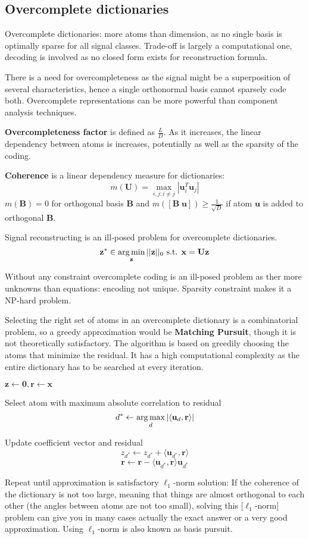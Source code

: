 \documentclass[12pt]{article}
\begin{document}
\subsection{Overcomplete dictionaries}
\par Overcomplete dictionaries: more atoms than dimension, as no single basis is optimally sparse for all signal classes. Trade-off is largely a computational one, decoding is involved as no closed form exists for reconstruction formula.
\par There is a need for overcompleteness as the signal might be a superposition of several characteristics, hence a single orthonormal basis cannot sparsely code both. Overcomplete representations can be more powerful than component analysis techniques.
\par \textbf{Overcompleteness factor} is defined as $\frac{L}{D}$. As it increases, the linear dependency between atoms is increases, potentially as well as the sparsity of the coding.
\par \textbf{Coherence} is a linear dependency measure for dictionaries:
\[ m(\mathbf{U}) = \max_{i,j: i\neq j} | \mathbf{u}_i^T \mathbf{u}_j | \]
$m(\mathbf{B}) = 0$ for orthogonal basis $\mathbf{B}$ and $m([\mathbf{B} \; \mathbf{u}]) \geq \frac{1}{\sqrt{D}}$ if atom $\mathbf{u}$ is added to orthogonal $\mathbf{B}$.
\par Signal reconstructing is an ill-posed problem for overcomplete dictionaries.
\[ \mathbf{z}^* \in \operatorname*{arg\,min}_{\mathbf{z}} ||\mathbf{z}||_0 \text{ s.t. } \mathbf{x = U z} \]
\par Without any constraint overcomplete coding is an ill-posed problem as ther more unknowns than equations: encoding not unique. Sparsity constraint makes it a NP-hard problem.
\par Selecting the right set of atoms in an overcomplete dictionary is a combinatorial problem, so a greedy approximation would be \textbf{Matching Pursuit}, though it is not theoretically satisfactory. The algorithm is based on greedily choosing the atoms that minimize the residual. It has a high computational complexity as the entire dictionary has to be searched at every iteration.
\olb
\item $\mathbf{z}\leftarrow \mathbf{0}, \mathbf{r}\leftarrow \mathbf{x}$
\item Select atom with maximum absolute correlation to residual
\[ d^* \leftarrow \operatorname*{arg\,max}_d |\langle \mathbf{u}_d, \mathbf{r} \rangle| \]
\item Update coefficient vector and residual
\[ z_{d^*} \leftarrow z_{d^*} + \langle \mathbf{u}_{d^*}, \mathbf{r} \rangle \]
\[ \mathbf{r}\leftarrow\mathbf{r} - \langle \mathbf{u}_{d^*}, \mathbf{r} \rangle \mathbf{u}_{d^*} \]
\item Repeat until approximation is satisfactory
\ole
$\ell_1$-norm solution: If the coherence of the dictionary is not too large, meaning that things are almost orthogonal to each other (the angles between atoms are not too small), solving this [$\ell_1$-norm] problem can give you in many cases actually the exact answer or a very good approximation. Using $\ell_1$-norm is also known as basis pursuit.
\end{document}
